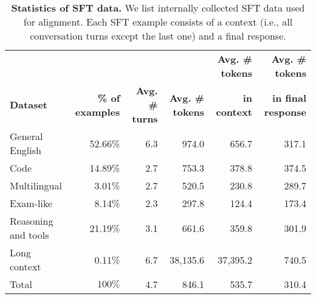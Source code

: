 
\begin{table}[t]
  \centering
  \setlength{\tabcolsep}{4pt}
   {
  \begin{tabular}{@{}l@{\hspace*{0mm}}rrrrr@{}}
    \toprule
      & & & & \textbf{Avg. \# tokens} & \textbf{Avg. \# tokens} \\
     \textbf{Dataset} & \textbf{\% of examples} & \textbf{Avg. \# turns} & \textbf{Avg. \# tokens} & \textbf{in context} & \textbf{in final response} \\
   \midrule
   General English & 52.66\% & 6.3 & 974.0 & 656.7 & 317.1\\
    Code & 14.89\% & 2.7 & 753.3 &  378.8  & 374.5 \\
    Multilingual & 3.01\% & 2.7 & 520.5 & 230.8 & 289.7 \\
    Exam-like & 8.14\% & 2.3 & 297.8 &  124.4 & 173.4 \\
    Reasoning and tools & 21.19\% & 3.1  & 661.6 & 359.8 & 301.9 \\
    Long context & 0.11\% & 6.7 & 38,135.6 & 37,395.2 & 740.5 \\
    \midrule
    Total & $100\%$ & 4.7 & 846.1 & 535.7 & 310.4 \\
    \bottomrule
  \end{tabular}}
  \vspace{0.3cm}
  \caption{\textbf{Statistics of SFT data.} We list internally collected SFT data used for \llamathree alignment. Each SFT example consists of a context (i.e., all conversation turns except the last one) and a final response.}
  \label{tab:sft_data}
\end{table}
